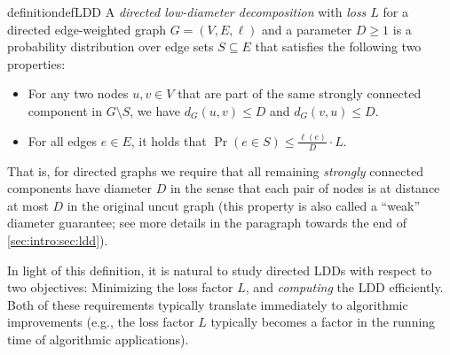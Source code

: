 \begin{restatable}{definition}{defLDD} \label{def:ldd} 
	A \emph{directed low-diameter decomposition} with \emph{loss $L$} for a directed edge-weighted graph $G = (V, E, \ell)$ and a parameter $D \geq 1$ is a probability distribution over edge sets $S \subseteq E$ that satisfies the following two properties:
	\begin{itemize}
		\item For any two nodes $u, v \in V$ that are part of the same strongly connected component in $G \setminus S$, we have $d_G(u, v) \leq D$ and $d_G(v, u) \leq D$.
		\item For all edges $e \in E$, it holds that $\Pr(e \in S) \leq \frac{\ell(e)}{D} \cdot L$.
	\end{itemize}
\end{restatable}

That is, for directed graphs we require that all remaining \emph{strongly} connected components have diameter $D$ in the sense that each pair of nodes is at distance at most $D$ in the original uncut graph (this property is also called a ``weak'' diameter guarantee; see more details in the paragraph towards the end of \cref{sec:intro:sec:ldd}).

In light of this definition, it is natural to study directed LDDs with respect to two objectives: Minimizing the loss factor $L$, and \emph{computing} the LDD efficiently. Both of these requirements typically translate immediately to algorithmic improvements (e.g., the loss factor $L$ typically becomes a factor in the running time of algorithmic applications).

